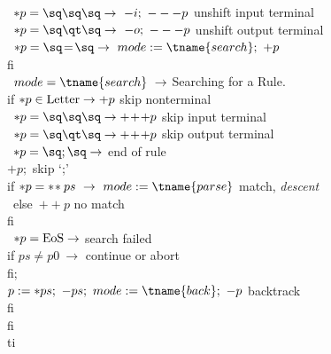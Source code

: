 \begin{tabbing}
\>\>	\orbox\ $*p=\sq\sq\sq \rightarrow\ -i;\ ---p$
					\>\>\>\>\>\>\bq unshift input terminal\\
\>\>	\orbox\ $*p=\sq\qt\sq \rightarrow\ -o;\ ---p$
					\>\>\>\>\>\>\bq unshift output terminal\\
\>\>	\orbox\ $*p=\sq\!=\!\sq \rightarrow\ mode:=\tname{search};\ +p$	\\
\>\>	f{}i								\\
\>  \orbox\ $mode=\tname{search}\ \rightarrow$ \>\>\>\>\>
						\bq Searching for a Rule.\\
\>\>	if $*p\in {\rm Letter} \rightarrow +p$ \>\>\>\>	
						\>\bq skip nonterminal\\
\>\>	\orbox\ $*p=\sq\sq\sq \rightarrow +\!+\!+p$ \>\>\>\>
						\>\bq skip input terminal\\
\>\>	\orbox\ $*p=\sq\qt\sq \rightarrow +\!+\!+p$ \>\>\>\>
						\>\bq skip output terminal\\
\>\>	\orbox\ $*p=\sq;\sq \rightarrow$ \>\>\>\>	\>\bq end of rule\\
\>\>\>	    $+p;$			   \>\>\>	\>\>\bq skip `;'\\
\>\>\>	    if $*p=*\!*ps\ \rightarrow\ mode:=\tname{parse}$
					\>\>\>		
					\>\>\bq match, {\em descent}	\\
\>\>\>	    \orbox\ else\ $+\!+p$	\>\>\>		\>\>\bq no match\\
\>\>\>	    f{}i							\\
\>\>	\orbox\ $*p={\rm EoS} \rightarrow$ 
					\>\>\>\>	\>\bq search failed \\
\>\>\>	    if $ps\not=p0\ \rightarrow$ \>\>\>\> \>\bq continue or abort\\
\>\>\>	    f{}i;							\\
\>\>\>	    $p:=*ps;\ -ps;\ mode:=\tname{back};\ -p$
					\>\>\>\>\>\bq backtrack		\\
\>\>	f{}i								\\
\>  f{}i								\\
ti
\end{tabbing}



